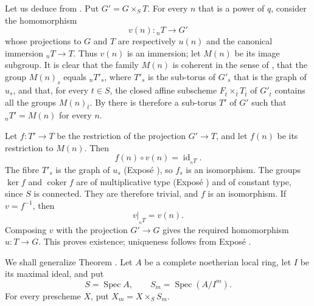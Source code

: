 
Let us deduce  from . Put
\(G'=G\times_S T\). For every \(n\) that is a power of \(q\), consider
the homomorphism
\[
  v(n):{}_nT\longrightarrow G'
\]
whose projections to \(G\) and \(T\) are respectively \(u(n)\) and
the canonical immersion \({}_nT\to T\). Thus \(v(n)\) is an immersion;
let \(M(n)\) be its image subgroup. It is clear that the family \(M(n)\) is coherent
in the sense of , that the group \(M(n)_s\) equals
\({}_nT'_s\), where \(T'_s\) is the sub-torus of \(G'_s\) that is the
graph of \(u_s\), and that, for every \(t\in S\), the closed affine
subscheme \(F_{\bar t}\times_{\bar t}T_{\bar t}\) of \(G'_{\bar t}\) contains all the groups
\(M(n)_{\bar t}\). By  there is therefore a sub-torus \(T'\) of
\(G'\) such that \({}_nT'=M(n)\) for every \(n\).

Let \(f:T'\to T\) be the restriction of the projection \(G'\to T\),
and let \(f(n)\) be its restriction to \(M(n)\). Then
\[
  f(n)\circ v(n)=\operatorname{id}_{{}_nT}.
\]
The fibre \(T'_s\) is the graph of \(u_s\) (Exposé ), so
\(f_s\) is an isomorphism. The groups \(\ker f\) and
\(\operatorname{coker}f\) are of multiplicative type (Exposé )
and of constant type, since \(S\) is connected. They are therefore
trivial, and \(f\) is an isomorphism. If \(v=f^{-1}\), then
\[
  v|_{{}_nT}=v(n).
\]
Composing \(v\) with the projection \(G'\to G\) gives the required
homomorphism \(u:T\to G\). This proves existence; uniqueness follows
from Exposé .


We shall generalize Theorem . Let \(A\) be a complete
noetherian local ring, let \(I\) be its maximal ideal, and put
\[
  S=\operatorname{Spec}A,\qquad
  S_m=\operatorname{Spec}(A/I^m).
\]
For every prescheme \(X\), put \(X_m=X\times_SS_m\).

